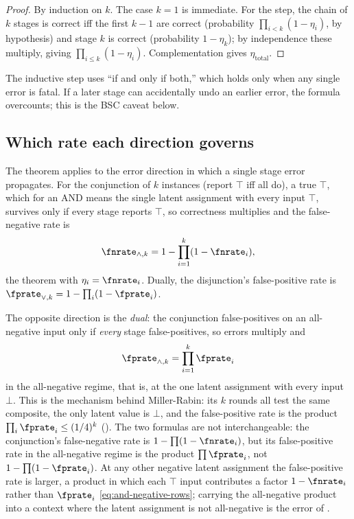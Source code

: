 \begin{proof}
By induction on $k$. The case $k = 1$ is immediate. For the step, the chain of
$k$ stages is correct iff the first $k - 1$ are correct (probability
$\prod_{i<k}(1 - \eta_i)$, by hypothesis) and stage $k$ is correct (probability
$1 - \eta_k$); by independence these multiply, giving $\prod_{i \le k}(1 -
\eta_i)$. Complementation gives $\eta_{\mathrm{total}}$.
\end{proof}

The inductive step uses ``if and only if both,'' which holds only when any
single error is fatal. If a later stage can accidentally undo an earlier error,
the formula overcounts; this is the BSC caveat below.

\subsection*{Which rate each direction governs}

The theorem applies to the error direction in which a single stage error
propagates. For the conjunction of $k$ instances (report $\top$ iff all do), a
true $\top$, which for an AND means the single latent assignment with every
input $\top$, survives only if every stage reports $\top$, so correctness
multiplies and the false-negative rate is
\[
  \fnrate_{\wedge,k} = 1 - \prod_{i=1}^{k}(1 - \fnrate_i),
\]
the theorem with $\eta_i = \fnrate_i$. Dually, the disjunction's false-positive
rate is $\fprate_{\vee,k} = 1 - \prod_i (1 - \fprate_i)$.

The opposite direction is the \emph{dual}: the conjunction false-positives on
an all-negative input only if \emph{every} stage false-positives, so errors
multiply and
\begin{equation}
\label{eq:composition-theorem}
  \fprate_{\wedge,k} = \prod_{i=1}^{k} \fprate_i
\end{equation}
in the all-negative regime, that is, at the one latent assignment with every
input $\bot$. This is the mechanism behind Miller-Rabin: its $k$ rounds all test
the same composite, the only latent value is $\bot$, and the false-positive
rate is the product $\prod_i \fprate_i \le (1/4)^k$ ().
The two formulas are not interchangeable: the conjunction's false-negative rate
is $1 - \prod(1 - \fnrate_i)$, but its false-positive rate in the all-negative
regime is the product $\prod \fprate_i$, not $1 - \prod(1 - \fprate_i)$. At
any other negative latent assignment the false-positive rate is larger, a
product in which each $\top$ input contributes a factor $1 - \fnrate_i$ rather
than $\fprate_i$ \eqref{eq:and-negative-rows}; carrying the all-negative
product into a context where the latent assignment is not all-negative is the
error of .

